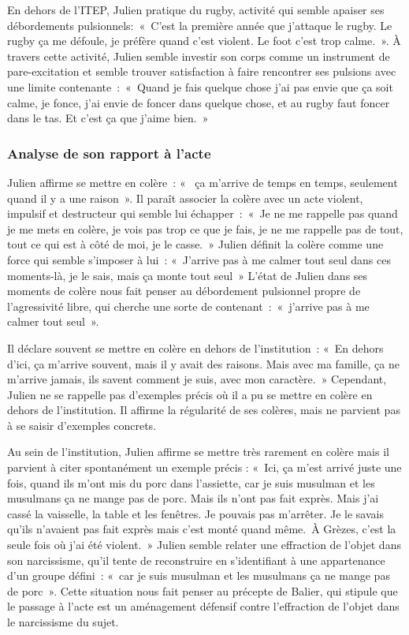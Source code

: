 \documentclass[12pt, a4paper]{book}
\begin{document}
\begin{spacing}{1.5}
En dehors de l'ITEP, Julien pratique du rugby, activité qui semble apaiser ses débordements pulsionnels: « C'est la première année que j'attaque le rugby. Le rugby ça me défoule, je préfère quand c'est violent. Le foot c'est trop calme. ». À travers cette activité, Julien semble investir son corps comme un instrument de pare-excitation et semble trouver satisfaction à faire rencontrer ses pulsions avec une limite contenante : « Quand je fais quelque chose j'ai pas envie que ça soit calme, je fonce, j'ai envie de foncer dans quelque chose, et au rugby faut foncer dans le tas. Et c'est ça que j'aime bien. » 

\subsubsection{Analyse de son rapport à l'acte}

Julien affirme se mettre en colère : «  ça m'arrive de temps en temps, seulement quand il y a une raison ». Il paraît associer la colère avec un acte violent, impulsif et destructeur qui semble lui échapper : « Je ne me rappelle pas quand je me mets en colère, je vois pas trop ce que je fais, je ne me rappelle pas de tout, tout ce qui est à côté de moi, je le casse. » Julien définit la colère comme une force qui semble s'imposer à lui : « J'arrive pas à me calmer tout seul dans ces moments-là, je le sais, mais ça monte tout seul » L'état de Julien dans ses moments de colère nous fait penser au débordement pulsionnel propre de l'agressivité libre, qui cherche une sorte de contenant : « j'arrive pas à me calmer tout seul ». 

Il déclare souvent se mettre en colère en dehors de l'institution : « En dehors d'ici, ça m'arrive souvent, mais il y avait des raisons. Mais avec ma famille, ça ne m'arrive jamais, ils savent comment je suis, avec mon caractère. » Cependant, Julien ne se rappelle pas d'exemples précis où il a pu se mettre en colère en dehors de l'institution. Il affirme la régularité de ses colères, mais ne parvient pas à se saisir d'exemples concrets.

Au sein de l'institution, Julien affirme se mettre très rarement en colère mais il parvient à citer spontanément un exemple précis : « Ici, ça m'est arrivé juste une fois, quand ils m'ont mis du porc dans l'assiette, car je suis musulman et les musulmans ça ne mange pas de porc. Mais ils n'ont pas fait exprès. Mais j'ai cassé la vaisselle, la table et les fenêtres. Je pouvais pas m'arrêter. Je le savais qu'ils n'avaient pas fait exprès mais c'est monté quand même. À Grèzes, c'est la seule fois où j'ai été violent. » Julien semble relater une effraction de l'objet dans son narcissisme, qu'il tente de reconstruire en s'identifiant à une appartenance d'un groupe défini : « car je suis musulman et les musulmans ça ne mange pas de porc ». Cette situation nous fait penser au précepte de Balier, qui stipule que le passage à l'acte est un aménagement défensif contre l'effraction de l'objet dans le narcissisme du sujet. 


\end{spacing}
\end{document}
